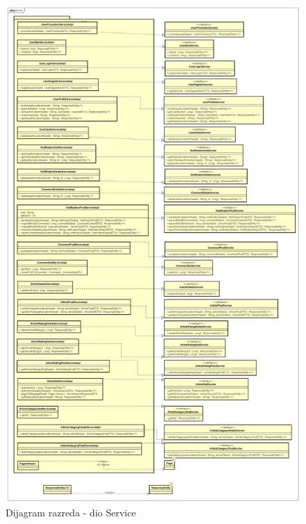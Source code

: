 \begin{figure}[H]
	\includegraphics[scale=0.25]{slike/Class Diagram Service.png}
	\centering
	\caption{Dijagram razreda - dio Service}
	\label{fig:class_diagram_service}
\end{figure}

\eject

